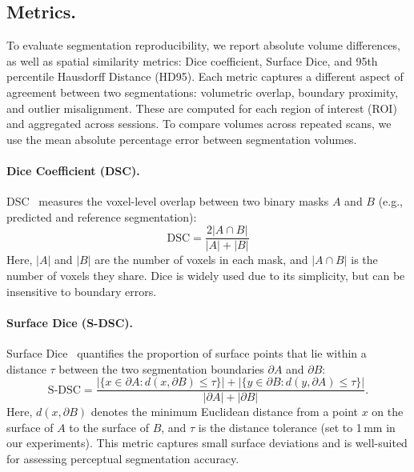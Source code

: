 \documentclass{midl} %
\begin{document}
\subsection{Metrics.} To evaluate segmentation reproducibility, we report absolute volume differences, as well as spatial similarity metrics: Dice coefficient, Surface Dice, and 95th percentile Hausdorff Distance (HD95). Each metric captures a different aspect of agreement between two segmentations: volumetric overlap, boundary proximity, and outlier misalignment. These are computed for each region of interest (ROI) and aggregated across sessions. To compare volumes across repeated scans, we use the mean absolute percentage error between segmentation volumes.

\paragraph{Dice Coefficient (DSC).} DSC~\cite{dice1945measures} measures the voxel-level overlap between two binary masks $A$ and $B$ (e.g., predicted and reference segmentation):
\begin{equation}
\mathrm{DSC} = \frac{2|A \cap B|}{|A| + |B|}
\label{eq:dice}
\end{equation}
Here, $|A|$ and $|B|$ are the number of voxels in each mask, and $|A \cap B|$ is the number of voxels they share. Dice is widely used due to its simplicity, but can be insensitive to boundary errors.

\paragraph{Surface Dice (S-DSC).} Surface Dice~\cite{nikolov2018deep} quantifies the proportion of surface points that lie within a distance $\tau$ between the two segmentation boundaries $\partial A$ and $\partial B$:
\begin{equation}
\label{eq:surfacedice}
\mathrm{S\text{-}DSC} =
\frac{
|\{x \in \partial A : d(x,\partial B) \le \tau\}|
+
|\{y \in \partial B : d(y,\partial A) \le \tau\}|
}{
|\partial A| + |\partial B|
}.
\end{equation}
Here, $d(x, \partial B)$ denotes the minimum Euclidean distance from a point $x$ on the surface of $A$ to the surface of $B$, and $\tau$ is the distance tolerance (set to 1\,mm in our experiments). This metric captures small surface deviations and is well-suited for assessing perceptual segmentation accuracy.
\end{document}
